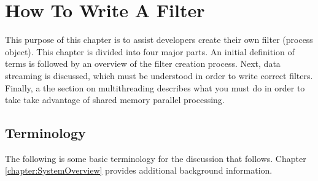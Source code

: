 \chapter{How To Write A Filter}
\label{chapter:WriteAFilter}

This purpose of this chapter is to assist developers create their own filter
(process object).  This chapter is divided into four major parts. An initial
definition of terms is followed by an overview of the filter creation
process. Next, data streaming is discussed, which must be understood in order
to write correct filters. Finally, a the section on multithreading describes
what you must do in order to take take advantage of shared memory parallel
processing.

\section{Terminology}
\label{sec:Terminology}

The following is some basic terminology for the discussion that follows.
Chapter \ref{chapter:SystemOverview} provides additional background
information.

